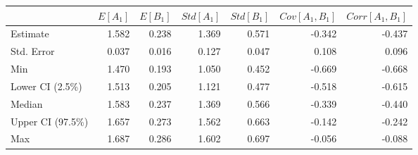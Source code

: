 \begin{tabular}{lrrrrrr}
\toprule
{} &    $E[A_1]$ &    $E[B_1]$ &  $Std[A_1]$ &  $Std[B_1]$ &  $Cov[A_1, B_1]$ &  $Corr[A_1, B_1]$ \\
\midrule
Estimate         &    1.582 &    0.238 &    1.369 &    0.571 &        -0.342 &         -0.437 \\
Std. Error       &    0.037 &    0.016 &    0.127 &    0.047 &         0.108 &          0.096 \\
Min              &    1.470 &    0.193 &    1.050 &    0.452 &        -0.669 &         -0.668 \\
Lower CI (2.5\%)  &    1.513 &    0.205 &    1.121 &    0.477 &        -0.518 &         -0.615 \\
Median           &    1.583 &    0.237 &    1.369 &    0.566 &        -0.339 &         -0.440 \\
Upper CI (97.5\%) &    1.657 &    0.273 &    1.562 &    0.663 &        -0.142 &         -0.242 \\
Max              &    1.687 &    0.286 &    1.602 &    0.697 &        -0.056 &         -0.088 \\
\bottomrule
\end{tabular}
